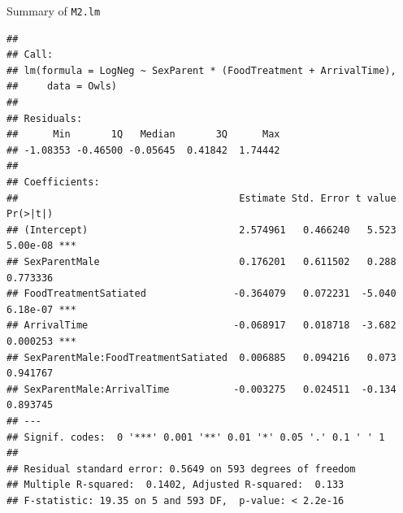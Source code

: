 \documentclass[
  ignorenonframetext,
]{beamer}
\begin{document}
\begin{frame}[fragile]{Summary of \texttt{M2.lm}}
\protect\hypertarget{summary-of-m2.lm}{}

\tiny

\begin{verbatim}
## 
## Call:
## lm(formula = LogNeg ~ SexParent * (FoodTreatment + ArrivalTime), 
##     data = Owls)
## 
## Residuals:
##      Min       1Q   Median       3Q      Max 
## -1.08353 -0.46500 -0.05645  0.41842  1.74442 
## 
## Coefficients:
##                                      Estimate Std. Error t value Pr(>|t|)    
## (Intercept)                          2.574961   0.466240   5.523 5.00e-08 ***
## SexParentMale                        0.176201   0.611502   0.288 0.773336    
## FoodTreatmentSatiated               -0.364079   0.072231  -5.040 6.18e-07 ***
## ArrivalTime                         -0.068917   0.018718  -3.682 0.000253 ***
## SexParentMale:FoodTreatmentSatiated  0.006885   0.094216   0.073 0.941767    
## SexParentMale:ArrivalTime           -0.003275   0.024511  -0.134 0.893745    
## ---
## Signif. codes:  0 '***' 0.001 '**' 0.01 '*' 0.05 '.' 0.1 ' ' 1
## 
## Residual standard error: 0.5649 on 593 degrees of freedom
## Multiple R-squared:  0.1402, Adjusted R-squared:  0.133 
## F-statistic: 19.35 on 5 and 593 DF,  p-value: < 2.2e-16
\end{verbatim}

\end{frame}
\end{document}
